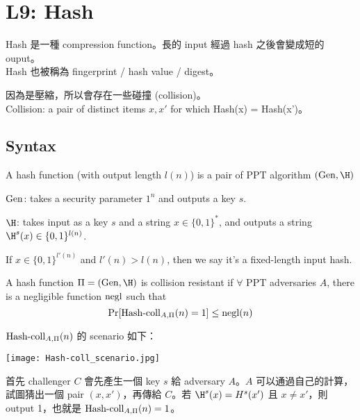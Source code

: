 \section{L9: Hash}

Hash 是一種 compression function。長的 input 經過 hash 之後會變成短的 ouput。 \\
Hash 也被稱為 fingerprint / hash value / digest。

因為是壓縮，所以會存在一些碰撞 (collision)。 \\
Collision: a pair of distinct items \(x, x'\) for which Hash(x) = Hash(x')。


\subsection{Syntax}

\begin{definition}
	A hash function (with output length \(l(n)\)) is a pair of PPT algorithm \((\Gen, \H)\)
	\begin{myItemize}
		\item \(\operatorname{Gen}\): takes a security parameter \(1^n\) and outputs a key \(s\).
		\item \(\H\): takes input as a key \(s\) and a string \(x \in \{0, 1\}^\ast\), and outputs a string \(\H^s(x) \in \{0, 1\}^{l(n)}\).
	\end{myItemize}
\end{definition}

If \(x \in \{0, 1\}^{l'(n)}\) and \(l'(n) > l(n)\), then we say it's a fixed-length input hash.

\vspace{1cm}

\begin{definition}
	A hash function \(\Pi = (\Gen, \H)\) is collision resistant if \(\forall\) PPT adversaries \(A\), there is a negligible function \(\operatorname{negl}\) such that
	\[\Pr[\operatorname{\mathrm{Hash-coll}}_{A, \Pi}(n) = 1] \leq \operatorname{negl}(n)\]
\end{definition}

\(\operatorname{\mathrm{Hash-coll}}_{A, \Pi}(n)\) 的 scenario 如下：
\begin{center}
	\texttt{[image: Hash-coll\_scenario.jpg]}
\end{center}
首先 challenger \(C\) 會先產生一個 key \(s\) 給 adversary \(A\)。\(A\) 可以通過自己的計算，試圖猜出一個 pair \((x, x')\)，再傳給 \(C\)。若 \(\H^s(x) = H^s(x')\) 且 \(x \neq x'\)，則 output 1，也就是 \(\operatorname{\mathrm{Hash-coll}}_{A, \Pi}(n) = 1\)。

